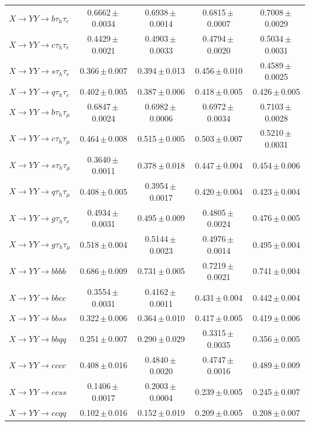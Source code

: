 \begin{landscape}
{\begin{longtable}{@{\extracolsep{\fill}}lcccc@{}}
\midrule
$X\to YY\to b\tau_h\tau_e$ & 0.6662\,$\pm$\,0.0034 & 0.6938\,$\pm$\,0.0014 & 0.6815\,$\pm$\,0.0007 & 0.7008\,$\pm$\,0.0029 \\
$X\to YY\to c\tau_h\tau_e$ & 0.4429\,$\pm$\,0.0021 & 0.4903\,$\pm$\,0.0033 & 0.4794\,$\pm$\,0.0020 & 0.5034\,$\pm$\,0.0031 \\
$X\to YY\to s\tau_h\tau_e$ & 0.366\,$\pm$\,0.007 & 0.394\,$\pm$\,0.013 & 0.456\,$\pm$\,0.010 & 0.4589\,$\pm$\,0.0025 \\
$X\to YY\to q\tau_h\tau_e$ & 0.402\,$\pm$\,0.005 & 0.387\,$\pm$\,0.006 & 0.418\,$\pm$\,0.005 & 0.426\,$\pm$\,0.005 \\
$X\to YY\to b\tau_h\tau_\mu$ & 0.6847\,$\pm$\,0.0024 & 0.6982\,$\pm$\,0.0006 & 0.6972\,$\pm$\,0.0034 & 0.7103\,$\pm$\,0.0028 \\
$X\to YY\to c\tau_h\tau_\mu$ & 0.464\,$\pm$\,0.008 & 0.515\,$\pm$\,0.005 & 0.503\,$\pm$\,0.007 & 0.5210\,$\pm$\,0.0031 \\
$X\to YY\to s\tau_h\tau_\mu$ & 0.3640\,$\pm$\,0.0011 & 0.378\,$\pm$\,0.018 & 0.447\,$\pm$\,0.004 & 0.454\,$\pm$\,0.006 \\
$X\to YY\to q\tau_h\tau_\mu$ & 0.408\,$\pm$\,0.005 & 0.3954\,$\pm$\,0.0017 & 0.420\,$\pm$\,0.004 & 0.423\,$\pm$\,0.004 \\
$X\to YY\to g\tau_h\tau_e$ & 0.4934\,$\pm$\,0.0031 & 0.495\,$\pm$\,0.009 & 0.4805\,$\pm$\,0.0024 & 0.476\,$\pm$\,0.005 \\
$X\to YY\to g\tau_h\tau_\mu$ & 0.518\,$\pm$\,0.004 & 0.5144\,$\pm$\,0.0023 & 0.4976\,$\pm$\,0.0014 & 0.495\,$\pm$\,0.004 \\
\midrule
$X\to YY\to bbbb$ & 0.686\,$\pm$\,0.009 & 0.731\,$\pm$\,0.005 & 0.7219\,$\pm$\,0.0021 & 0.741\,$\pm$\,0.004 \\
$X\to YY\to bbcc$ & 0.3554\,$\pm$\,0.0031 & 0.4162\,$\pm$\,0.0011 & 0.431\,$\pm$\,0.004 & 0.442\,$\pm$\,0.004 \\
$X\to YY\to bbss$ & 0.322\,$\pm$\,0.006 & 0.364\,$\pm$\,0.010 & 0.417\,$\pm$\,0.005 & 0.419\,$\pm$\,0.006 \\
$X\to YY\to bbqq$ & 0.251\,$\pm$\,0.007 & 0.290\,$\pm$\,0.029 & 0.3315\,$\pm$\,0.0035 & 0.356\,$\pm$\,0.005 \\
$X\to YY\to cccc$ & 0.408\,$\pm$\,0.016 & 0.4840\,$\pm$\,0.0020 & 0.4747\,$\pm$\,0.0016 & 0.489\,$\pm$\,0.009 \\
$X\to YY\to ccss$ & 0.1406\,$\pm$\,0.0017 & 0.2003\,$\pm$\,0.0004 & 0.239\,$\pm$\,0.005 & 0.245\,$\pm$\,0.007 \\
$X\to YY\to ccqq$ & 0.102\,$\pm$\,0.016 & 0.152\,$\pm$\,0.019 & 0.209\,$\pm$\,0.005 & 0.208\,$\pm$\,0.007 \\

\end{longtable}}
\end{landscape}
